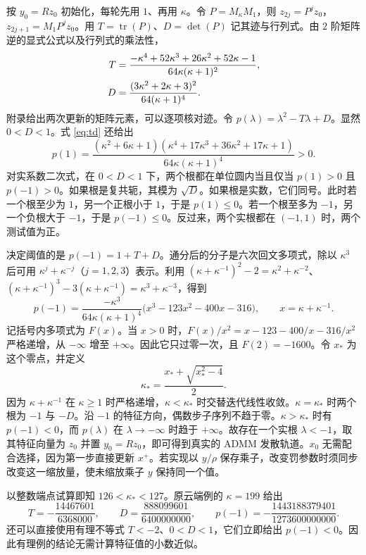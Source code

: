 \documentclass[UTF8,zihao=-4,fontset=windows]{ctexart}
\newcommand{\tr}{\operatorname{tr}}
\begin{document}
按 $y_0=Rz_0$ 初始化，每轮先用 $1$、再用 $\kappa$。令 $P=M_\kappa M_1$，则 $z_{2j}=P^jz_0$，$z_{2j+1}=M_1P^jz_0$。用 $T=\tr(P)$、$D=\det(P)$ 记其迹与行列式。由 $2$ 阶矩阵逆的显式公式以及行列式的乘法性，
\begin{align}
 T &=\frac{-\kappa^4+52\kappa^3+26\kappa^2+52\kappa-1}
              {64\kappa(\kappa+1)^2}, \notag\\
 D &=\frac{(3\kappa^2+2\kappa+3)^2}{64(\kappa+1)^4}. \label{eq:td}
\end{align}
附录给出两次更新的矩阵元素，可以逐项核对迹。令 $p(\lambda)=\lambda^2-T\lambda+D$。显然 $0<D<1$。式 \eqref{eq:td} 还给出
\[
 p(1)=
 \frac{(\kappa^2+6\kappa+1)(\kappa^4+17\kappa^3+36\kappa^2+17\kappa+1)}
 {64\kappa(\kappa+1)^4}>0.
\]
对实系数二次式，在 $0<D<1$ 下，两个根都在单位圆内当且仅当 $p(1)>0$ 且 $p(-1)>0$。如果根是复共轭，其模为 $\sqrt D$。如果根是实数，它们同号。此时若一个根至少为 $1$，另一个正根小于 $1$，于是 $p(1)\le0$。若一个根至多为 $-1$，另一个负根大于 $-1$，于是 $p(-1)\le0$。反过来，两个实根都在 $(-1,1)$ 时，两个测试值为正。

决定阈值的是 $p(-1)=1+T+D$。通分后的分子是六次回文多项式，除以 $\kappa^3$ 后可用 $\kappa^j+\kappa^{-j}$（$j=1,2,3$）表示。利用 $(\kappa+\kappa^{-1})^2-2=\kappa^2+\kappa^{-2}$、$(\kappa+\kappa^{-1})^3-3(\kappa+\kappa^{-1})=\kappa^3+\kappa^{-3}$，得到
\[
 p(-1)=\frac{-\kappa^3}{64\kappa(\kappa+1)^4}
 \bigl(x^3-123x^2-400x-316\bigr),\qquad x=\kappa+\kappa^{-1}.
\]
记括号内多项式为 $F(x)$。当 $x>0$ 时，$F(x)/x^2=x-123-400/x-316/x^2$ 严格递增，从 $-\infty$ 增至 $+\infty$。因此它只过零一次，且 $F(2)=-1600$。令 $x_*$ 为这个零点，并定义
\[
 \kappa_*=\frac{x_*+\sqrt{x_*^2-4}}2.
\]
因为 $\kappa+\kappa^{-1}$ 在 $\kappa\ge1$ 时严格递增，$\kappa<\kappa_*$ 时交替迭代线性收敛。$\kappa=\kappa_*$ 时两个根为 $-1$ 与 $-D$。沿 $-1$ 的特征方向，偶数步子序列不趋于零。$\kappa>\kappa_*$ 时有 $p(-1)<0$，而 $p(\lambda)$ 在 $\lambda\to-\infty$ 时趋于 $+\infty$。故存在一个实根 $\lambda<-1$，取其特征向量为 $z_0$ 并置 $y_0=Rz_0$，即可得到真实的 ADMM 发散轨道。$x_0$ 无需配合选择，因为第一步直接更新 $x^+$。若实现以 $y/\rho$ 保存乘子，改变罚参数时须同步改变这一缩放量，使未缩放乘子 $y$ 保持同一个值。

以整数端点试算即知 $126<\kappa_*<127$。原云端例的 $\kappa=199$ 给出
\[
 T=-\frac{14467601}{6368000},\qquad
 D=\frac{888099601}{6400000000},\qquad
 p(-1)=-\frac{1443188379401}{1273600000000}.
\]
还可以直接使用有理不等式 $T<-2$、$0<D<1$，它们立即给出 $p(-1)<0$。因此有理例的结论无需计算特征值的小数近似。
\end{document}
